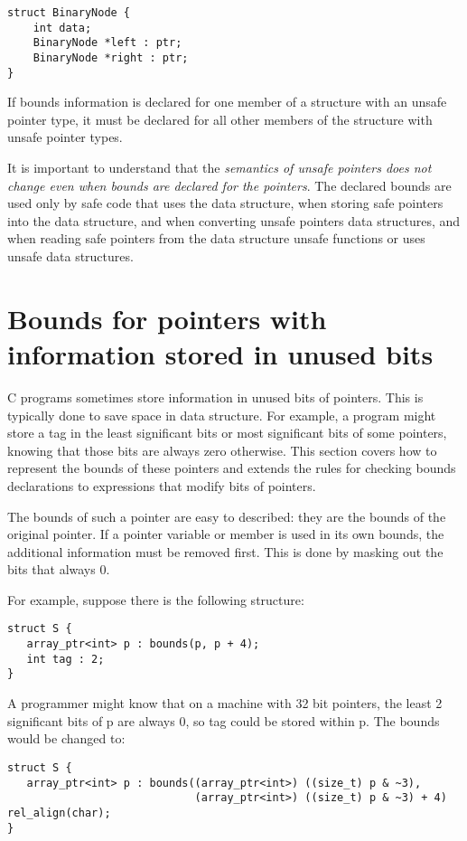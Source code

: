 \begin{verbatim}
struct BinaryNode {
    int data;
    BinaryNode *left : ptr;
    BinaryNode *right : ptr;
}
\end{verbatim}

If bounds information is declared for one member of a structure with an
unsafe pointer type, it must be declared for all other members of the
structure with unsafe pointer types.

It is important to understand that the \emph{semantics of unsafe
pointers does not change even when bounds are declared for the
pointers}. The declared bounds are used only by safe code that uses the
data structure, when storing safe pointers into the data structure, and
when converting unsafe pointers data structures, and when reading safe
pointers from the data structure unsafe functions or uses unsafe data
structures.

\section{Bounds for pointers with information stored in unused bits}

C programs sometimes store information in unused bits of pointers. This
is typically done to save space in data structure. For example, a
program might store a tag in the least significant bits or most
significant bits of some pointers, knowing that those bits are always
zero otherwise. This section covers how to represent the bounds of these
pointers and extends the rules for checking bounds declarations to
expressions that modify bits of pointers.

The bounds of such a pointer are easy to described: they are the bounds
of the original pointer. If a pointer variable or member is used in its
own bounds, the additional information must be removed first. This is
done by masking out the bits that always 0.

For example, suppose there is the following structure:

\begin{verbatim}
struct S {
   array_ptr<int> p : bounds(p, p + 4);
   int tag : 2;
}
\end{verbatim}

A programmer might know that on a machine with 32 bit pointers, the
least 2 significant bits of p are always 0, so tag could be stored
within p. The bounds would be changed to:

\begin{verbatim}
struct S {
   array_ptr<int> p : bounds((array_ptr<int>) ((size_t) p & ~3), 
                             (array_ptr<int>) ((size_t) p & ~3) + 4) rel_align(char);
}
\end{verbatim}

